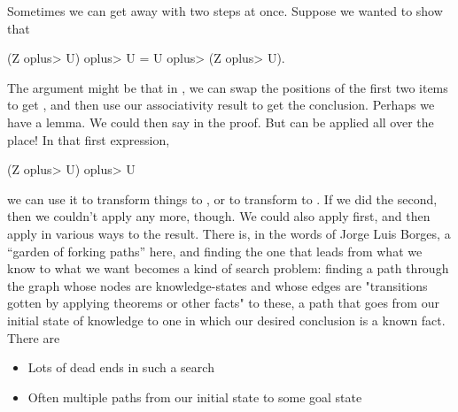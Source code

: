 Sometimes we can get away with two steps at once. Suppose we wanted to show that 
\begin{IS}
(Z \<oplus> U) \<oplus> U = U \<oplus>  (Z \<oplus> U).    
\end{IS}
The argument might be that in , we can swap the positions of the first two items to get , and then use our associativity result to get the conclusion. Perhaps we have a  lemma. We could then say  in the proof. But  can be applied all over the place! In that first expression,
\begin{IS}
(Z \<oplus> U) \<oplus> U    
\end{IS}
we can use it to transform things to , or to transform to . If we did the second, then we couldn't apply  any more, though. We could also apply  first, and then apply  in various ways to the result. There is, in the words of Jorge Luis Borges, a ``garden of forking paths'' here, and finding the one that leads from what we know to what we want becomes a kind of search problem: finding a path through the graph whose nodes are knowledge-states and whose edges are "transitions gotten by applying theorems or other facts" to these, a path that goes from our initial state of knowledge to one in which our desired conclusion is a known fact. There are 
\begin{itemize}
    \item Lots of dead ends in such a search
    \item Often multiple paths from our initial state to some goal state
\end{itemize}
